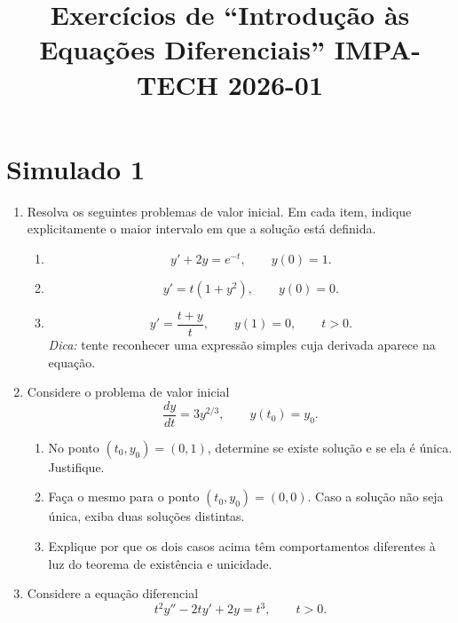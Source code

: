 \documentclass[a4paper,
11pt,  reqno]{amsart}
\title{Exercícios de ``Introdução às Equações Diferenciais''  IMPA-TECH 2026-01}
\begin{document}
\maketitle

\section*{Simulado 1}

\vspace{5mm}

\begin{enumerate}

\item Resolva os seguintes problemas de valor inicial. Em cada item, indique explicitamente o maior intervalo em que a solução está definida.

\begin{enumerate}
    \item 
    \[
        y' + 2y = e^{-t}, \qquad y(0)=1.
    \]

    \item 
    \[
        y' = t(1+y^2), \qquad y(0)=0.
    \]

    \item 
    \[
        y' = \frac{t+y}{t}, \qquad y(1)=0, \qquad t>0.
    \]
    \emph{Dica:} tente reconhecer uma expressão simples cuja derivada aparece na equação.
\end{enumerate}

\vspace{2mm}

\item Considere o problema de valor inicial
\[
    \frac{dy}{dt}=3y^{2/3},
    \qquad
    y(t_0)=y_0.
\]

\begin{enumerate}
    \item No ponto $(t_0,y_0)=(0,1)$, determine se existe solução e se ela é única. Justifique.

    \item Faça o mesmo para o ponto $(t_0,y_0)=(0,0)$. Caso a solução não seja única, exiba duas soluções distintas.

    \item Explique por que os dois casos acima têm comportamentos diferentes à luz do teorema de existência e unicidade.
\end{enumerate}


\vspace{2mm}

\item Considere a equação diferencial
\[
    t^2y''-2ty'+2y=t^3,
    \qquad
    t>0.
\]


\end{enumerate}
\end{document}
